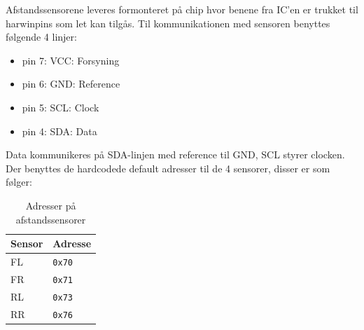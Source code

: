Afstandssensorene leveres formonteret på chip hvor benene fra IC'en er trukket til harwinpins som let kan tilgås. Til kommunikationen med sensoren benyttes følgende 4 linjer: 

\begin{itemize}
	\item pin 7: VCC: Forsyning
	\item pin 6: GND: Reference
	\item pin 5: SCL: Clock
	\item pin 4: SDA: Data
\end{itemize}

Data kommunikeres på SDA-linjen med reference til GND,  SCL styrer clocken.
Der benyttes de hardcodede default adresser til de 4 sensorer, disser er som følger: 

\begin{table}[h]\centering
\begin{tabular}{| l | l |} \hline
	\textbf{Sensor} 	& \textbf{Adresse} \\\hline
	FL & \texttt{0x70} \\\hline
	FR & \texttt{0x71} \\\hline
	RL & \texttt{0x73} \\\hline
	RR & \texttt{0x76} \\\hline
\end{tabular}
\caption{Adresser på afstandssensorer}
\label{table:adr_afstandssensorer}
\end{table}